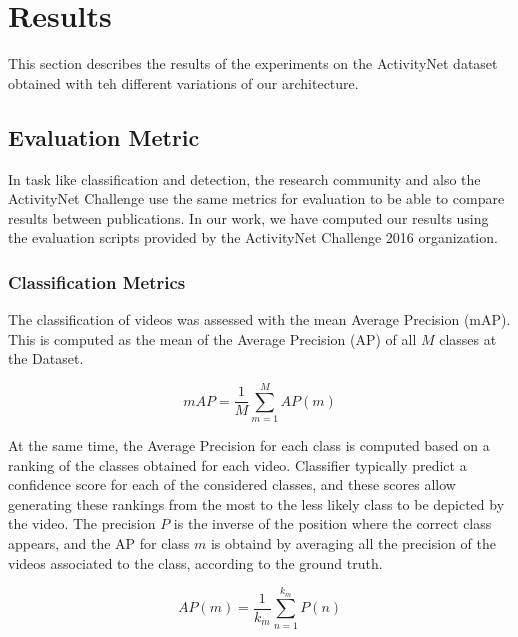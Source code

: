 \chapter{Results}
\label{section:results}

This section describes the results of the experiments on the ActivityNet dataset obtained with teh different variations of our architecture.

\section{Evaluation Metric}

In task like classification and detection, the research community and also the ActivityNet Challenge use the same metrics for evaluation to be able to compare results between publications. In our work, we have computed our results using the evaluation scripts provided by the ActivityNet Challenge 2016 organization.

\subsection{Classification Metrics}

The classification of videos was assessed with the mean Average Precision (mAP). This is computed as the mean of the Average Precision (AP) of all $M$ classes at the Dataset.

\begin{equation}
	mAP = \frac{1}{M} \sum_{m=1}^{M} AP(m)
\end{equation}

At the same time, the Average Precision for each class is computed based on a ranking of the classes obtained for each video. Classifier typically predict a confidence score for each of the considered classes, and these scores allow generating these rankings from the most to the less likely class to be depicted by the video. The precision $P$ is the inverse of the position where the correct class appears, and the AP for class $m$ is obtaind by averaging all the precision of the videos associated to the class, according to the ground truth. %

\begin{equation}
	AP(m) = \frac{1}{k_m} \sum_{n=1}^{k_m} P(n)
\end{equation}

